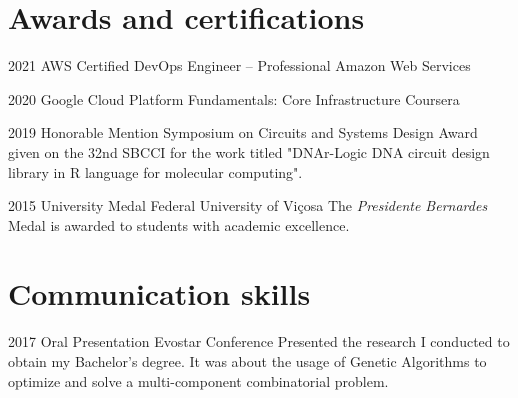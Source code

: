 \documentclass[a4paper]{cv-friggeri-x}
\begin{document}
{%

\section{Awards and certifications}

\begin{entrylist}


\entrywide
    {2021}
    {AWS Certified DevOps Engineer – Professional}
    {Amazon Web Services}

\entrywide
    {2020}
    {Google Cloud Platform Fundamentals: Core Infrastructure}
    {Coursera}

\entrywide
    {2019}
    {Honorable Mention}
    {Symposium on Circuits and Systems Design}
    {Award given on the 32nd SBCCI for the work titled "DNAr-Logic DNA circuit design library in R language for molecular computing".}

\entrywide
    {2015}
    {University Medal}
    {Federal University of Vi\c cosa}
    {The \textit{Presidente Bernardes} Medal is awarded to students with academic excellence.}


\end{entrylist}


\section{Communication skills}

\begin{entrylist}


\entrywide
{2017}
{Oral Presentation}
{Evostar Conference}
{Presented the research I conducted to obtain my Bachelor's degree. It was about the usage of Genetic Algorithms to optimize and solve a multi-component combinatorial problem.}



\end{entrylist}}
\end{document}
